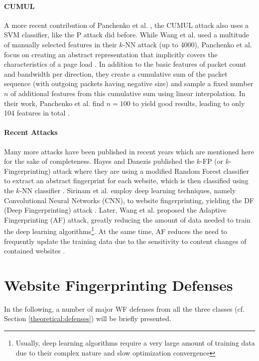 \documentclass[
	ruledheaders=chapter,
	class=report,
	thesis={type=master, department=inf},
	accentcolor=1c,
	custommargins=true,
	marginpar=false,
	parskip=half-,
	fontsize=11pt,
]{tudapub}
\begin{document}
	\paragraph{CUMUL} A more recent contribution of Panchenko et al. \cite{Panchenko2016}, the CUMUL attack also uses a SVM classifier, like the P attack did before. While Wang et al. used a multitude of manually selected features in their $k$-NN attack (up to 4000), Panchenko et al. focus on creating an abstract representation that implicitly covers the characteristics of a page load \cite{Wang2014,Panchenko2016}. In addition to the basic features of packet count and bandwidth per direction, they create a cumulative sum of the packet sequence (with outgoing packets having negative size) and sample a fixed number $n$ of additional features from this cumulative sum using linear interpolation. In their work, Panchenko et al. find $n = 100$ to yield good results, leading to only 104 features in total \cite{Panchenko2016}.
	
	\paragraph{Recent Attacks} Many more attacks have been published in recent years which are mentioned here for the sake of completeness. Hayes and Danezis published the $k$-FP (or $k$-Fingerprinting) attack where they are using a modified Random Forest classifier to extract an abstract fingerprint for each website, which is then classified using the $k$-NN classifier \cite{Hayes2016}. Sirinam et al. employ deep learning techniques, namely Convolutional Neural Networks (CNN), to website fingerprinting, yielding the DF (Deep Fingerprinting) attack \cite{Sirinam2018}. Later, Wang et al. proposed the Adaptive Fingerprinting (AF) attack, greatly reducing the amount of data needed to train the deep learning algorithms\footnote{Usually, deep learning algorithms require a very large amount of training data due to their complex nature and slow optimization convergence}. At the same time, AF reduces the need to frequently update the training data due to the sensitivity to content changes of contained websites \cite{Wang2021}.
	
	\section{Website Fingerprinting Defenses}
	\label{prior:defenses}
	
	In the following, a number of major WF defenses from all the three classes (cf. Section \ref{theoretical:defenses}) will be briefly presented.
	
\end{document}
